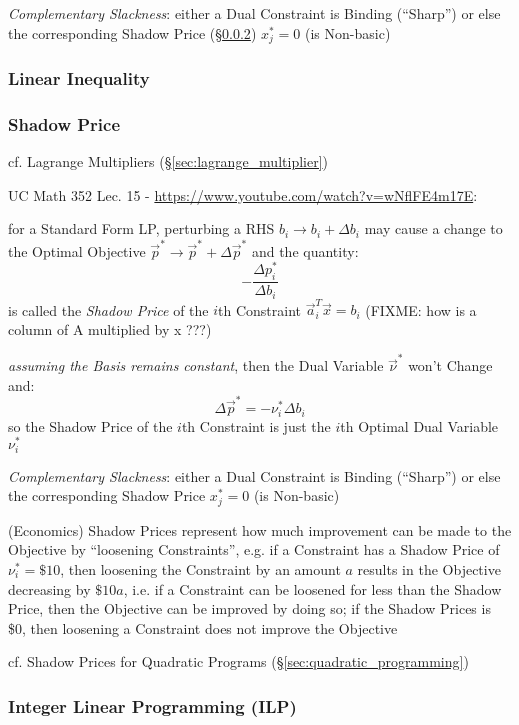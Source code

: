 \emph{Complementary Slackness}: either a Dual Constraint is Binding (``Sharp'')
or else the corresponding Shadow Price (\S\ref{sec:shadow_price}) $x_j^* = 0$
(is Non-basic)



\subsubsection{Linear Inequality}\label{sec:linear_inequality}

\subsubsection{Shadow Price}\label{sec:shadow_price}

cf. Lagrange Multipliers (\S\ref{sec:lagrange_multiplier})

UC Math 352 Lec. 15 - \url{https://www.youtube.com/watch?v=wNflFE4m17E}:

for a Standard Form LP, perturbing a RHS $b_i \rightarrow b_i + \Delta{b_i}$
may cause a change to the Optimal Objective
$\vec{p}^* \rightarrow \vec{p}^* + \Delta{\vec{p}^*}$ and the quantity:
\[
  -\frac{\Delta p_i^*}{\Delta b_i}
\]
is called the \emph{Shadow Price} of the $i$th Constraint $\vec{a}_i^T\vec{x} =
b_i$
(FIXME: how is a column of A multiplied by x ???)

\emph{assuming the Basis remains constant}, then the Dual Variable
$\vec{\nu}^*$ won't Change and:
\[
  \Delta \vec{p}^* = - \nu_i^* \Delta b_i
\]
so the Shadow Price of the $i$th Constraint is just the $i$th Optimal Dual
Variable $\nu_i^*$

\emph{Complementary Slackness}: either a Dual Constraint is Binding (``Sharp'')
or else the corresponding Shadow Price $x_j^* = 0$ (is Non-basic)

(Economics) Shadow Prices represent how much improvement can be made to the
Objective by ``loosening Constraints'', e.g. if a Constraint has a Shadow Price
of $\nu_i^* = \$10$, then loosening the Constraint by an amount $a$ results in
the Objective decreasing by $\$10 a$, i.e. if a Constraint can be loosened for
less than the Shadow Price, then the Objective can be improved by doing so; if
the Shadow Prices is \$0, then loosening a Constraint does not improve the
Objective

\fist cf. Shadow Prices for Quadratic Programs
(\S\ref{sec:quadratic_programming})



\subsubsection{Integer Linear Programming (ILP)}\label{sec:ilp}

